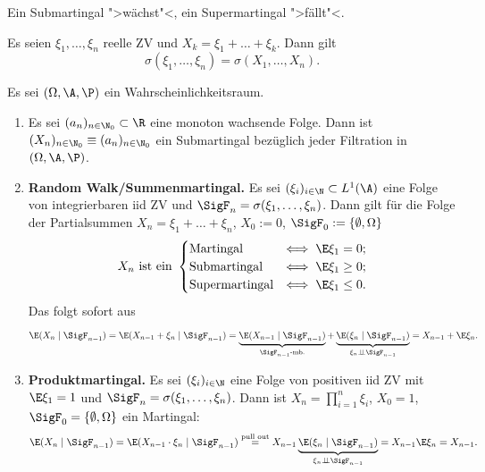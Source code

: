 \documentclass[11pt, a4paper]{article}
\begin{document}
\begin{note}
    Ein Submartingal ">wächst"<, ein Supermartingal ">fällt"<.
\end{note}

\begin{lemma}
    Es seien $\xi_1, \dots, \xi_n$ reelle ZV und $X_k = \xi_1 + \dots + \xi_k$. Dann gilt
    $$\sigma(\xi_1, \dots, \xi_n) = \sigma(X_1, \dots, X_n).$$
\end{lemma}

\begin{example}
    Es sei $(\Omega, \A, \P)$ ein Wahrscheinlichkeitsraum.
    \begin{enumerate}[label=\alph*)]
        \item Es sei $(a_n)_{n \in \N_0} \subset \R$ eine monoton wachsende Folge. Dann ist $(X_n)_{n \in \N_0} \equiv (a_n)_{n \in \N_0}$ ein Submartingal bezüglich jeder Filtration in $(\Omega, \A, \P)$.
        \item \textbf{Random Walk/Summenmartingal.} Es sei $(\xi_i)_{i \in \N} \subset L^1(\A)$ eine Folge von integrierbaren iid ZV und $\SigF_n = \sigma(\xi_1, \dots, \xi_n)$. Dann gilt für die Folge der Partialsummen $X_n = \xi_1 + \dots + \xi_n$, $X_0 := 0$, $\SigF_0 := \{\emptyset, \Omega\}$
        $$X_n \text{ ist ein } \begin{cases} \text{Martingal} & \Longleftrightarrow \; \E \xi_1 = 0; \\ \text{Submartingal} & \Longleftrightarrow \; \E \xi_1 \ge 0; \\ \text{Supermartingal} & \Longleftrightarrow \; \E \xi_1 \le 0. \end{cases}$$
        Das folgt sofort aus
        $$\E(X_n \mid \SigF_{n-1}) = \E(X_{n-1} + \xi_n \mid \SigF_{n-1}) = \underbrace{\E(X_{n-1} \mid \SigF_{n-1})}_{\SigF_{n-1}\text{-mb.}} + \underbrace{\E(\xi_n \mid \SigF_{n-1})}_{\xi_n \perp\!\!\!\perp \SigF_{n-1}} = X_{n-1} + \E\xi_n.$$
        \item \textbf{Produktmartingal.} Es sei $(\xi_i)_{i \in \N}$ eine Folge von positiven iid ZV mit $\E \xi_1 = 1$ und $\SigF_n = \sigma(\xi_1, \dots, \xi_n)$. Dann ist $X_n = \prod_{i=1}^n \xi_i$, $X_0 = 1$, $\SigF_0 = \{\emptyset, \Omega\}$ ein Martingal:
        $$\E(X_n \mid \SigF_{n-1}) = \E(X_{n-1} \cdot \xi_n \mid \SigF_{n-1}) \overset{\text{pull out}}{=} X_{n-1} \underbrace{\E(\xi_n \mid \SigF_{n-1})}_{\xi_n \perp\!\!\!\perp \SigF_{n-1}} = X_{n-1} \E \xi_n = X_{n-1}.$$
    \end{enumerate}
\end{example}
\end{document}
